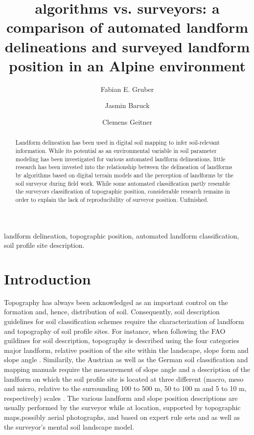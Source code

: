 \documentclass[final,1p,times,twocolumn,authoryear]{elsarticle}
\begin{document}
\begin{frontmatter}

\title{algorithms vs. surveyors: a comparison of automated landform delineations and surveyed landform position in an Alpine environment}


\author{Fabian E. Gruber}
\author{Jasmin Baruck}
\author{Clemens Geitner}

\address{University of Innsbruck}

\begin{abstract}
Landform delineation has been used in digital soil mapping to infer soil-relevant information. While its potential as an environmental variable in soil parameter modeling has been investigated for various automated landform delineations, little research has been invested into the relationship between the delineation of landforms by algorithms based on digital terrain models and the perception of landforms by the soil surveyor during field work.
While some automated classification partly resemble the surveyors classification of topographic position, considerable research remains in order to explain the lack of reproducibility of surveyor position. Unfinished.
\end{abstract}

\begin{keyword}
landform delineation, topographic position, automated landform classification, soil profile site description.
\end{keyword}

\end{frontmatter}

\linenumbers

\section{Introduction}
Topography has always been acknowledged as an important control on the formation and, hence, distribution of soil. Consequently, soil description guidelines for soil classification schemes require the characterization of landform and topography of soil profile sites. For instance, when following the FAO guildines for soil description, topography is described using the four categories major landform, relative position of the site within the landscape, slope form and slope angle \citep{FAO2006}. Similarily, the Austrian \citep{Nestroy2011} as well as the German soil classification and mapping manuals \citep{ArbeitsgruppeBoden2006} require the measurement of slope angle and a description of the landform on which the soil profile site is located at three different (macro, meso and micro, relative to the surrounding 100 to 500 m, 50 to 100 m and 5 to 10 m, respectively) scales \citep{Englisch1998}. The various landform and slope position descriptions are usually performed by the surveyor while at location, supported by topographic maps,possibly aerial photographs, and based on expert rule sets and as well as the surveyor's mental soil landscape model. 
\end{document}
